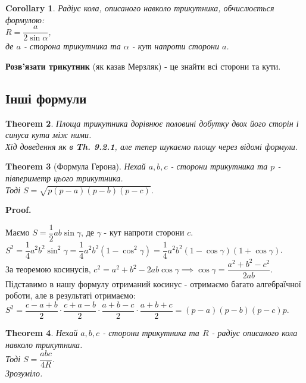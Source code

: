 \documentclass[a4paper, 10pt]{article}
\makeatletter
\def\qed{$\blacksquare$}
\theoremstyle{theoremdd}
\newtheorem{theorem}{Theorem}[subsection]
\theoremstyle{theoremdd}
\theoremstyle{theoremdd}
\theoremstyle{theoremdd}
\theoremstyle{theoremdd}
\theoremstyle{theoremdd}
\theoremstyle{theoremdd}
\theoremstyle{theoremdd}
\theoremstyle{theoremdd}
\newtheorem{corollary}[theorem]{Corollary}
\renewenvironment{proof}[1][Proof.\\]{\par
\pushQED{\hfill \qed}%
\normalfont \topsep6\p@\@plus6\p@\relax
\trivlist
\item\relax
{\bfseries
#1\@addpunct{.}}\hspace\labelsep\ignorespaces
}{%
\popQED\endtrivlist\@endpefalse
}
\makeatother
\begin{document}
\begin{corollary}
Радіус кола, описаного навколо трикутника, обчислюється формулою:\\
$R = \dfrac{a}{2 \sin \alpha}$, \\ де $a$ - сторона трикутника та $\alpha$ - кут напроти сторони $a$.
\end{corollary}

\textbf{Розв'язати трикутник} (як казав Мерзляк) - це знайти всі сторони та кути.

\subsection{Інші формули}
\begin{theorem}
Площа трикутника дорівнює половині добутку двох його сторін і синуса кута між ними.\\
\textit{Хід доведення як в \textbf{Th. 9.2.1}, але тепер шукаємо площу через відомі формули.}
\end{theorem}

\begin{theorem}[Формула Герона]
Нехай $a,b,c$ - сторони трикутника та $p$ - півпериметр цього трикутника. \\
Тоді $S = \sqrt{p(p-a)(p-b)(p-c)}$.
\end{theorem}

\begin{proof}
Маємо $S = \dfrac{1}{2}ab \sin \gamma$, де $\gamma$ - кут напроти сторони $c$.\\
$S^2 = \dfrac{1}{4}a^2 b^2 \sin^2 \gamma = \dfrac{1}{4} a^2 b^2 (1- \cos^2 \gamma) = \dfrac{1}{4}a^2 b^2 (1-\cos \gamma) (1+ \cos \gamma)$.\\
За теоремою косинусів, $c^2 = a^2+b^2-2ab \cos \gamma \implies \cos \gamma = \dfrac{a^2+b^2-c^2}{2ab}$.\\
Підставимо в нашу формулу отриманий косинус - отримаємо багато алгебраїчної роботи, але в результаті отримаємо:\\
$S^2 = \dfrac{c-a+b}{2} \cdot \dfrac{c+a-b}{2} \cdot \dfrac{a+b-c}{2} \cdot \dfrac{a+b+c}{2} = (p-a)(p-b)(p-c)p$.
\end{proof}

\begin{theorem}
Нехай $a,b,c$ - сторони трикутника та $R$ - радіус описаного кола навколо трикутника.\\
Тоді $S = \dfrac{abc}{4R}$.\\
\textit{Зрозуміло.}
\end{theorem}
\end{document}
